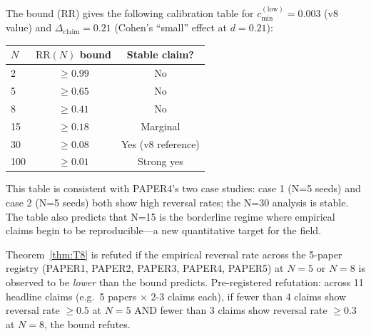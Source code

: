 \begin{remark}
\label{rem:T8_calibration_table}
The bound (RR) gives the following calibration table for
$c_{\min}^{(\mathrm{low})} = 0.003$ (v8 value) and
$\Delta_{\mathrm{claim}} = 0.21$ (Cohen's ``small'' effect at $d=0.21$):

\begin{center}
\small
\begin{tabular}{@{}lcc@{}}
\toprule
$N$ & $\mathrm{RR}(N)$ bound & Stable claim? \\
\midrule
   2 &  $\ge 0.99$            & No  \\
   5 &  $\ge 0.65$            & No  \\
   8 &  $\ge 0.41$            & No  \\
  15 &  $\ge 0.18$            & Marginal \\
  30 &  $\ge 0.08$            & Yes (v8 reference) \\
 100 &  $\ge 0.01$            & Strong yes \\
\bottomrule
\end{tabular}
\end{center}
This table is consistent with PAPER4's two case studies: case 1 (N=5
seeds) and case 2 (N=5 seeds) both show high reversal rates; the N=30
analysis is stable. The table also predicts that N=15 is the borderline
regime where empirical claims begin to be reproducible---a new
quantitative target for the field.
\end{remark}

\begin{remark}
\label{rem:T8_falsification}
Theorem~\ref{thm:T8} is refuted if the empirical reversal rate across the
5-paper registry (PAPER1, PAPER2, PAPER3, PAPER4, PAPER5) at $N=5$ or $N=8$
is observed to be \emph{lower} than the bound predicts. Pre-registered
refutation: across 11 headline claims (e.g.\ 5 papers $\times$ 2-3 claims
each), if fewer than 4 claims show reversal rate $\ge 0.5$ at $N=5$ AND
fewer than 3 claims show reversal rate $\ge 0.3$ at $N=8$, the bound
refutes.
\end{remark}

